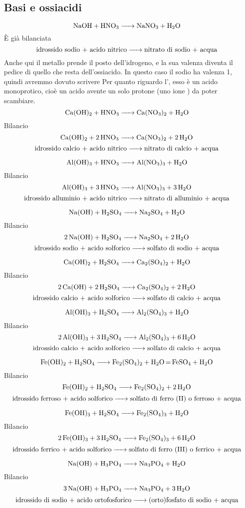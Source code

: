 \subsection{Basi e ossiacidi}

$$\ce{NaOH + HNO_3 -> NaNO_3 + H_2O}$$
È già bilanciata
$$\text{idrossido sodio + acido nitrico} \ce{->} \text{nitrato di sodio + acqua}$$
Anche qui il metallo prende il posto dell'idrogeno, e la sua valenza diventa il pedice di quello che resta dell'ossiacido. In questo caso il sodio ha valenza 1, quindi avremmo dovuto scrivere 
Per quanto riguardo l', esso è un acido monoprotico, cioè un acido avente un solo protone (uno ione ) da poter scambiare.
$$\ce{Ca(OH)_2 + HNO_3 -> Ca(NO_3)_2 + H_2O}$$Bilancio
$$\ce{Ca(OH)_2 + 2 HNO_3 -> Ca(NO_3)_2 + 2 H_2O}$$
$$\text{idrossido calcio + acido nitrico} \ce{->} \text{nitrato di calcio + acqua}$$

$$\ce{Al(OH)_3 + HNO_3 -> Al(NO_3)_3 + H_2O}$$Bilancio
\newpage
$$\ce{Al(OH)_3 + 3 HNO_3 -> Al(NO_3)_3 + 3 H_2O}$$
$$\text{idrossido alluminio + acido nitrico} \ce{->} \text{nitrato di alluminio + acqua}$$

$$\ce{Na(OH) + H_2SO_4 -> Na_2SO_4 + H_2O}$$Bilancio
$$\ce{2 Na(OH) + H_2SO_4 -> Na_2SO_4 + 2 H_2O}$$
$$\text{idrossido sodio + acido solforico} \ce{->} \text{solfato di sodio + acqua}$$

$$\ce{Ca(OH)_2 + H_2SO_4 -> Ca_2(SO_4)_2 + H_2O}$$Bilancio
$$\ce{2 Ca(OH) + 2H_2SO_4 -> Ca_2(SO_4)_2 +  2 H_2O}$$
$$\text{idrossido calcio + acido solforico} \ce{->} \text{solfato di calcio + acqua}$$

$$\ce{Al(OH)_3 + H_2SO_4 -> Al_2(SO_4)_3 + H_2O}$$Bilancio
$$\ce{2 Al(OH)_3 + 3H_2SO_4 -> Al_2(SO_4)_3 + 6 H_2O}$$
$$\text{idrossido calcio + acido solforico} \ce{->} \text{solfato di calcio + acqua}$$

$$\ce{Fe(OH)_2 + H_2SO_4 -> Fe_2(SO_4)_2 + H_2O \text{=} FeSO_4 + H_2O}$$Bilancio
$$\ce{Fe(OH)_2 + H_2SO_4 -> Fe_2(SO_4)_2 + 2 H_2O}$$
$$\text{idrossido ferroso + acido solforico} \ce{->} \text{solfato di ferro (II) o ferroso + acqua}$$

$$\ce{Fe(OH)_3 + H_2SO_4 -> Fe_2(SO_4)_3 + H_2O}$$Bilancio
$$\ce{2 Fe(OH)_3 + 3H_2SO_4 -> Fe_2(SO_4)_3 + 6 H_2O}$$
$$\text{idrossido ferrico + acido solforico} \ce{->} \text{solfato di ferro (III) o ferrico + acqua}$$

$$\ce{Na(OH) + H_3PO_4 -> Na_3PO_4 + H_2O}$$Bilancio
$$\ce{3 Na(OH) + H_3PO_4 -> Na_3PO_4 + 3 H_2O}$$
$$\text{idrossido di sodio + acido ortofosforico} \ce{->} \text{(orto)fosfato di sodio + acqua}$$


